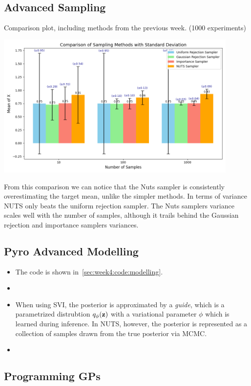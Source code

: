 \subsection{Advanced Sampling}
Comparison plot, including methods from the previous week. (1000 experiments)
\begin{center}
    \includegraphics[width=12cm]{./figures/comparison2.png}
\end{center}
From this comparison we can notice that the Nuts sampler is consistently overestimating the target mean, unlike the simpler methods.
In terms of variance NUTS only beats the uniform rejection sampler.
The Nuts samplers variance scales well with the number of samples, 
although it trails behind the Gaussian rejection and importance samplers variances.

\subsection{Pyro Advanced Modelling}

\begin{itemize}
  \item The code is shown in~\cref{sec:week4:code:modelling}.
  \item
  \item
  When using SVI, the posterior is approximated by a \emph{guide},
  which is a parametrized distrubtion $q_{\phi}(\bm{\mathrm{z}})$ with a
  variational parameter $\phi$ which is learned during inference.
  In NUTS, however, the posterior is represented as a collection
  of samples drawn from the true posterior via MCMC.
  \item
\end{itemize}

\subsection{Programming GPs}

